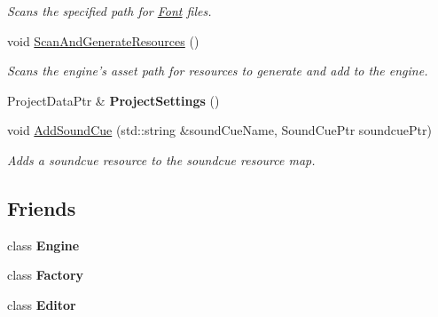 \begin{DoxyCompactItemize}
\begin{DoxyCompactList}\small\item\em Scans the specified path for \hyperlink{classDCEngine_1_1Font}{Font} files. \end{DoxyCompactList}\item 
void \hyperlink{classDCEngine_1_1Systems_1_1Content_a12d79aa3afbd0ee1d48bcc885de355b7}{Scan\-And\-Generate\-Resources} ()
\begin{DoxyCompactList}\small\item\em Scans the engine's asset path for resources to generate and add to the engine. \end{DoxyCompactList}\item 
\hypertarget{classDCEngine_1_1Systems_1_1Content_aec249a2278c6b8f04e8e80579dbc4848}{Project\-Data\-Ptr \& {\bfseries Project\-Settings} ()}\label{classDCEngine_1_1Systems_1_1Content_aec249a2278c6b8f04e8e80579dbc4848}

\item 
void \hyperlink{classDCEngine_1_1Systems_1_1Content_ac6c5048b17bdb09a4ffa660d88b90048}{Add\-Sound\-Cue} (std\-::string \&sound\-Cue\-Name, Sound\-Cue\-Ptr soundcue\-Ptr)
\begin{DoxyCompactList}\small\item\em Adds a soundcue resource to the soundcue resource map. \end{DoxyCompactList}\end{DoxyCompactItemize}
\subsection*{Friends}
\begin{DoxyCompactItemize}
\item 
\hypertarget{classDCEngine_1_1Systems_1_1Content_a3e1914489e4bed4f9f23cdeab34a43dc}{class {\bfseries Engine}}\label{classDCEngine_1_1Systems_1_1Content_a3e1914489e4bed4f9f23cdeab34a43dc}

\item 
\hypertarget{classDCEngine_1_1Systems_1_1Content_a328c093d609680cca505905c6d49901a}{class {\bfseries Factory}}\label{classDCEngine_1_1Systems_1_1Content_a328c093d609680cca505905c6d49901a}

\item 
\hypertarget{classDCEngine_1_1Systems_1_1Content_ae8a991e13e07be28086d82e28524e64f}{class {\bfseries Editor}}\label{classDCEngine_1_1Systems_1_1Content_ae8a991e13e07be28086d82e28524e64f}

\end{DoxyCompactItemize}
